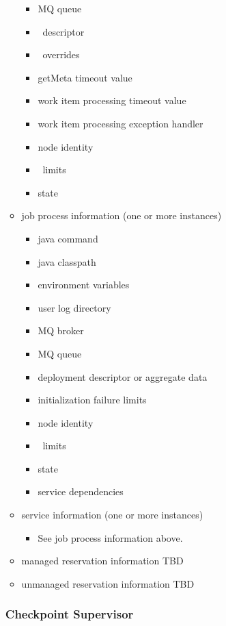 \begin{itemize}
\begin{itemize}
\begin{itemize}
          \item MQ queue
          \item \varCollectionReader~descriptor
          \item \varCollectionReader~overrides
          \item getMeta timeout value
          \item work item processing timeout value
          \item work item processing exception handler
          \item node identity
          \item \varLinuxControlGroup~limits
          \item state
        \end{itemize} 
      \item job process information (one or more instances)
        \begin{itemize}
          \item java command
          \item java classpath
          \item environment variables
          \item user log directory
          \item MQ broker
          \item MQ queue
          \item deployment descriptor or aggregate data
          \item initialization failure limits
          \item node identity
          \item \varLinuxControlGroup~limits
          \item state
          \item service dependencies
        \end{itemize} 
      \item service information (one or more instances)
        \begin{itemize}
          \item See job process information above.
        \end{itemize} 
      \item managed reservation information
        TBD      
      \item unmanaged reservation information
        TBD          
    \end{itemize} 
    
    \subsubsection{Checkpoint Supervisor} 
    

\end{itemize}
